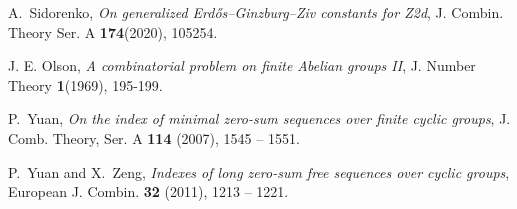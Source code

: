 \documentclass[11pt]{amsart}
\theoremstyle{definition}
\numberwithin{equation}{section}
\begin{document}
\begin{thebibliography}{99}
A.~Sidorenko,  \emph{On generalized Erdős–Ginzburg–Ziv constants for Z2d}, J. Combin. Theory Ser. A \textbf{174}(2020), 105254.

 J. E. Olson,
\emph{A combinatorial problem on finite Abelian groups II},
J. Number Theory \textbf{1}(1969), 195-199.


P.~Yuan, \emph{On the index of minimal zero-sum sequences over finite cyclic
	groups}, J. Comb. Theory, Ser. A \textbf{114} (2007), 1545 -- 1551.

P.~Yuan and X.~Zeng, \emph{Indexes of long zero-sum free sequences over cyclic
	groups}, European J. Combin. \textbf{32} (2011), 1213 -- 1221.

\end{thebibliography}
\end{document}

